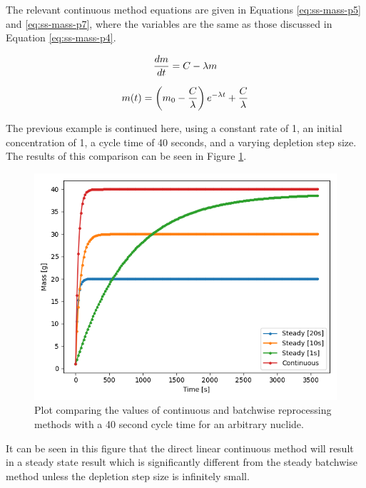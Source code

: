 The relevant continuous method equations are given in Equations \eqref{eq:ss-mass-p5} and \eqref{eq:ss-mass-p7}, where the variables are the same as those discussed in Equation \eqref{eq:ss-mass-p4}.

\begin{equation} \hfill
\frac{dm}{dt} = C - \lambda m
\hfill\label{eq:ss-mass-p5} \end{equation}


\begin{equation} \hfill
m(t) = \left(m_0 - \frac{C}{\lambda} \right) e^{-\lambda t} + \frac{C}{\lambda}
\hfill\label{eq:ss-mass-p7} \end{equation}

The previous example is continued here, using a constant rate of 1, an initial concentration of 1, a cycle time of 40 seconds, and a varying depletion step size. The results of this comparison can be seen in Figure \ref{fig:steady_cont_repr_diff}.

\begin{figure}[H]
  \centering
  \includegraphics[scale=0.7]{images/dirlin-steady-comp.png}
  \caption{Plot comparing the values of continuous and batchwise reprocessing methods with a 40 second cycle time for an arbitrary nuclide.}
   \label{fig:steady_cont_repr_diff}
\end{figure}


It can be seen in this figure that the direct linear continuous method will result in a steady state result which is significantly different from the steady batchwise method unless the depletion step size is infinitely small.


